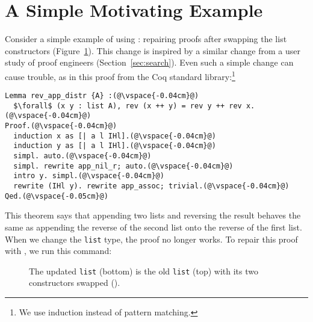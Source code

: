 \section{A Simple Motivating Example}
\label{sec:overview}

Consider a simple example of using \toolname: repairing proofs after swapping the list constructors (Figure~\ref{fig:listswap}).
This change is inspired by a similar change from a user study of proof engineers (Section~\ref{sec:search}).
Even such a simple change can cause trouble, as in this proof from the Coq standard library:\footnote{We use induction instead of pattern matching.}

\begin{lstlisting}
Lemma rev_app_distr {A} :(@\vspace{-0.04cm}@)
  $\forall$ (x y : list A), rev (x ++ y) = rev y ++ rev x.(@\vspace{-0.04cm}@)
Proof.(@\vspace{-0.04cm}@)
  induction x as [| a l IHl].(@\vspace{-0.04cm}@)
  induction y as [| a l IHl].(@\vspace{-0.04cm}@)
  simpl. auto.(@\vspace{-0.04cm}@)
  simpl. rewrite app_nil_r; auto.(@\vspace{-0.04cm}@)
  intro y. simpl.(@\vspace{-0.04cm}@)
  rewrite (IHl y). rewrite app_assoc; trivial.(@\vspace{-0.04cm}@)
Qed.(@\vspace{-0.05cm}@)
\end{lstlisting}
This theorem says that appending two lists and reversing the result behaves the same as appending
the reverse of the second list onto the reverse of the first list.
When we change the \lstinline{list} type, the proof no longer works.
To repair this proof with \toolname, we run this command:

\begin{figure}
\begin{minipage}{0.46\textwidth}
   
\end{minipage}
\hfill
\begin{minipage}{0.46\textwidth}
   
\end{minipage}
\vspace{-0.4cm}
\caption{The updated \lstinline{list} (bottom) is the old \lstinline{list} (top) with its two constructors swapped ().}
\label{fig:listswap}
\end{figure}

